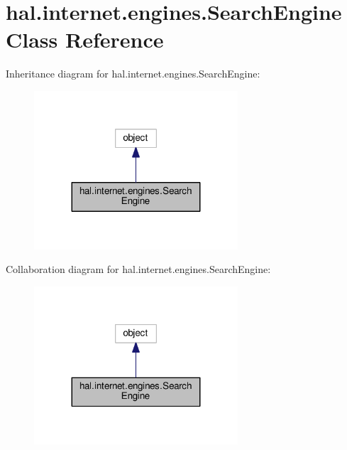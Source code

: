 \hypertarget{classhal_1_1internet_1_1engines_1_1_search_engine}{}\section{hal.\+internet.\+engines.\+Search\+Engine Class Reference}
\label{classhal_1_1internet_1_1engines_1_1_search_engine}


Inheritance diagram for hal.\+internet.\+engines.\+Search\+Engine\+:\nopagebreak
\begin{figure}[H]
\begin{center}
\leavevmode
\includegraphics[width=215pt]{classhal_1_1internet_1_1engines_1_1_search_engine__inherit__graph}
\end{center}
\end{figure}


Collaboration diagram for hal.\+internet.\+engines.\+Search\+Engine\+:\nopagebreak
\begin{figure}[H]
\begin{center}
\leavevmode
\includegraphics[width=215pt]{classhal_1_1internet_1_1engines_1_1_search_engine__coll__graph}
\end{center}
\end{figure}
